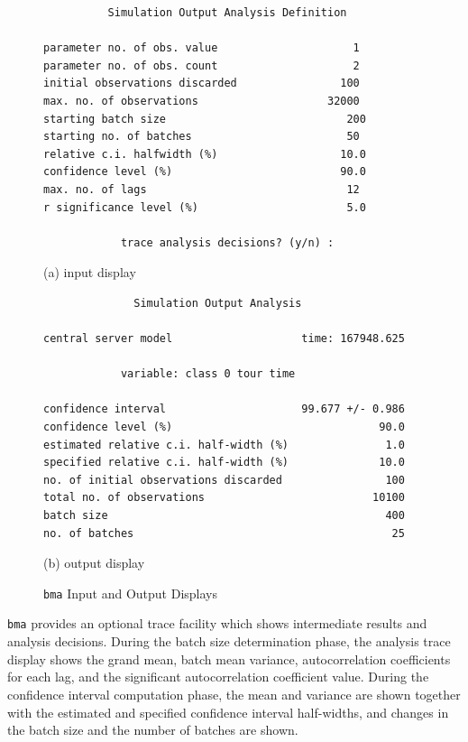 \begin{figure}[p]
\centering
\begin{minipage}{0.9\textwidth}
\small
\begin{verbatim}
          Simulation Output Analysis Definition

parameter no. of obs. value                     1
parameter no. of obs. count                     2
initial observations discarded                100
max. no. of observations                    32000
starting batch size                            200
starting no. of batches                        50
relative c.i. halfwidth (%)                   10.0
confidence level (%)                          90.0
max. no. of lags                               12
r significance level (%)                       5.0

            trace analysis decisions? (y/n) :
\end{verbatim}
\centering (a) input display
\end{minipage}

\bigskip
\begin{minipage}{0.9\textwidth}
\small
\begin{verbatim}
              Simulation Output Analysis

central server model                    time: 167948.625

            variable: class 0 tour time

confidence interval                     99.677 +/- 0.986
confidence level (%)                                90.0
estimated relative c.i. half-width (%)               1.0
specified relative c.i. half-width (%)              10.0
no. of initial observations discarded                100
total no. of observations                          10100
batch size                                           400
no. of batches                                        25
\end{verbatim}
\centering (b) output display
\end{minipage}
\caption{\texttt{bma} Input and Output Displays}
\label{fig:smpl-bma}
\end{figure}

\texttt{bma} provides an optional trace facility which shows intermediate
results and analysis decisions. During the batch size determination phase,
the analysis trace display shows the grand mean, batch mean variance,
autocorrelation coefficients for each lag, and the significant autocorrelation
coefficient value. During the confidence interval computation phase, the
mean and variance are shown together with the estimated and specified
confidence interval half-widths, and changes in the batch size and the
number of batches are shown.

